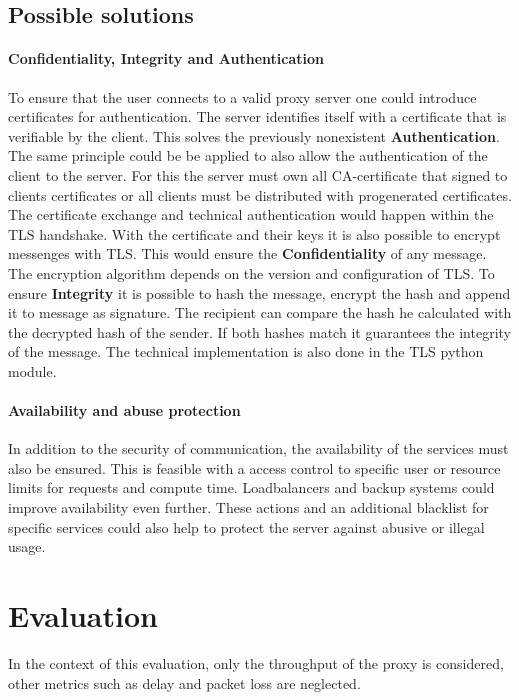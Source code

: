 \documentclass[12pt, a4paper]{scrartcl}
\begin{document}
\subsection{Possible solutions}
\paragraph{Confidentiality, Integrity and Authentication}
To ensure that the user connects to a valid proxy server one could introduce certificates for authentication. The server identifies itself with a certificate that is verifiable by the client. This solves the previously nonexistent \textbf{Authentication}. The same principle could be be applied to also allow the authentication of the client to the server. For this the server must own all CA-certificate that signed to clients certificates or all clients must be distributed with progenerated certificates.\newline
The certificate exchange and technical authentication would happen within the \ac{TLS} handshake. With the certificate and their keys it is also possible to encrypt messenges with \ac{TLS}. This would ensure the \textbf{Confidentiality} of any message. The encryption algorithm depends on the version and configuration of \ac{TLS}.\newline
To ensure \textbf{Integrity} it is possible to hash the message, encrypt the hash and append it to message as signature. The recipient can compare the hash he calculated with the decrypted hash of the sender. If both hashes match it guarantees the integrity of the message.\newline
The technical implementation is also done in the \ac{TLS} python module.
\paragraph{Availability and abuse protection}
In addition to the security of communication, the availability of the services must also be ensured. This is feasible with a access control to specific user or resource limits for requests and compute time. Loadbalancers and backup systems could improve availability even further.\newline
These actions and an additional blacklist for specific services could also help to protect the server against abusive or illegal usage.

\section{Evaluation}
In the context of this evaluation, only the throughput of the proxy is considered, other metrics such as delay and packet loss are neglected.
\end{document}
